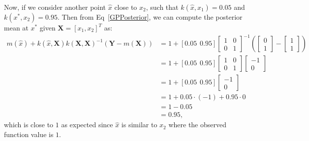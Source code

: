 Now, if we consider another point $\hat{x}$ close to $x_2$, such that $k(\hat{x}, x_1)=0.05$ and $k(x^*, x_2)=0.95$. Then from Eq~\ref{GPPosterior}, we can compute the posterior mean at $x^*$ given $\mathbf{X}=[x_1, x_2]^T$ as:
{\small\begingroup
\renewcommand{\arraystretch}{1.25}
\setlength\arraycolsep{2.5pt}
\begin{align}
    m\left(\hat{x}\right)+k\left(\hat{x}, \mathbf{X}\right) k\left(\mathbf{X}, \mathbf{X}\right)^{-1}\left(\mathbf{Y}-m\left(\mathbf{X}\right)\right) & = 1 + [0.05 \hspace{5pt} 0.95] \left[\begin{array}{cc}
        1 & 0 \\
        0 & 1
    \end{array}\right]^{-1} \left(\left[\begin{array}{c}
        0\\
        1
        \end{array}\right] -
        \left[\begin{array}{c}
        1\\
        1
        \end{array}\right]
        \right)\\
        &= 1 + [0.05 \hspace{5pt} 0.95] \left[\begin{array}{cc}
        1 & 0 \\
        0 & 1
    \end{array}\right] \left[\begin{array}{c}
        -1\\
        0
        \end{array}\right]\\
        &= 1 + [0.05 \hspace{5pt} 0.95] \left[\begin{array}{c}
        -1\\
        0
        \end{array}\right]\\
        &= 1 + 0.05\cdot (-1) + 0.95 \cdot 0\\
        &= 1 -0.05\\
        &= 0.95,
\end{align}
\endgroup
}
which is close to $1$ as expected since $\hat{x}$ is similar to $x_2$ where the observed function value is $1$.


